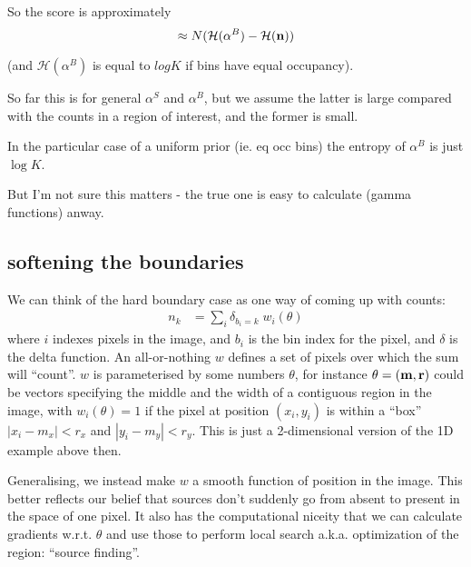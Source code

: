 \documentclass[11pt]{article}
\begin{document}
So the score is approximately
\begin{equation}
\approx N(\mathcal{H}(\alpha^B) - \mathcal{H}(\mathbf{n}))
\end{equation}

(and $\mathcal{H}(\alpha^B)$ is equal to $log K$ if bins have equal occupancy).

So far this is for general $\alpha^S$ and $\alpha^B$, but we assume
the latter is large compared with the counts in a region of interest,
and the former is small.

In the particular case of a uniform prior (ie. eq occ bins) the
entropy of $\alpha^B$ is just $\log K$.

But I'm not sure this matters - the true one is easy to calculate
(gamma functions) anway.

\subsection{softening the boundaries}

We can think of the hard boundary case as one way of coming up with counts:
\begin{align}
n_k &= \sum_i \delta_{b_i=k} \; w_i(\theta) 
\end{align}
where $i$ indexes pixels in the image, and $b_i$ is the bin index for
the \ith pixel, and $\delta$ is the delta function. An all-or-nothing
$w$ defines a set of pixels over which the sum will ``count''. $w$ is
parameterised by some numbers $\theta$, for instance
$\theta=(\mathbf{m},\mathbf{r})$ could be vectors specifying the middle and the
width of a contiguous region in the image, with $w_i(\theta)=1$ if the
\ith pixel at position $(x_i,y_i)$ is within a ``box'' $| x_i - m_{x}|
< r_x$ and $| y_i - m_{y}| < r_y$. This is just a 2-dimensional
version of the 1D example above then.

Generalising, we instead make $w$ a smooth function of position
in the image.  This better reflects our belief that sources don't
suddenly go from absent to present in the space of one pixel. It also
has the computational niceity that we can calculate gradients
w.r.t. $\theta$ and use those to perform local search
a.k.a. optimization of the region: ``source finding''.
\end{document}
